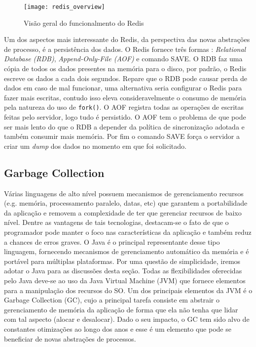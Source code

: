 \begin{figure}[!h]
  \centering
  \texttt{[image: redis\_overview]}
  \caption{Visão geral do funcionalmento do Redis}
  \label{fig:redis}
\end{figure}

Um dos aspectos mais interessante do Redis, da perspectiva das novas abstrações
de processo, é a persistência dos dados. O Redis fornece três formas
\citep{redisio}: \textit{Relational Database (RDB)}, \textit{Append-Only-File
(AOF)} e comando SAVE. O RDB faz uma cópia de todos os dados presentes na
memória para o disco, por padrão, o Redis escreve os dados a cada dois
segundos. Repare que o RDB pode causar perda de dados em caso de mal funcionar,
uma alternativa seria configurar o Redis para fazer mais escritas, contudo isso
eleva consideravelmente o consumo de memória pela natureza do uso de
\texttt{fork()}. O AOF registra todas as operações de escritas feitas pelo
servidor, logo tudo é persistido. O AOF tem o problema de que pode ser mais
lento do que o RDB a depender da política de sincronização adotada e também
consumir mais memória.  Por fim o comando SAVE força o servidor a criar um
\textit{dump} dos dados no momento em que foi solicitado.


\subsection{Garbage Collection}

Várias linguagens de alto nível possuem mecanismos de gerenciamento recursos
(e.g. memória, processamento paralelo, datas, etc) que garantem a portabilidade
da aplicação e removem a complexidade de ter que gerenciar recursos de baixo
nível. Dentre as vantagens de tais tecnologias, destacam-se o fato de que o
programador pode manter o foco nas características da aplicação e também reduz
a chances de erros graves. O Java é o principal representante desse tipo
linguagem, fornecendo mecanismos de gerenciamento automático da memória e é
portável para múltiplas plataformas. Por uma questão de simplicidade, iremos
adotar o Java para as discussões desta seção. Todas as flexibilidades
oferecidas pelo Java deve-se ao uso da Java Virtual Machine (JVM) que fornece
elementos para a manipulação dos recursos do SO. Um dos principais elementos da
JVM é o Garbage Collection (GC), cujo a principal tarefa consiste em abstrair o
gerenciamento de memória da aplicação de forma que ela não tenha que lidar com
tal aspecto (alocar e desalocar). Dado o seu impacto, o GC tem sido alvo de
constantes otimizações ao longo dos anos e esse é um elemento que pode se
beneficiar de novas abstrações de processos.

